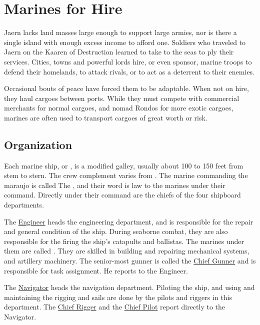 \chapter{Marines for Hire}
\label{ch:marines}
\setlength{\columnsep}{\defcolwidth}
\begin{multicols*}{2}
Jaern lacks land masses large enough to support large armies, nor is there a single island with enough excess income to afford one. Soldiers who traveled to Jaern on the Kaaren of Destruction learned to take to the seas to ply their services. Cities, towns and powerful lords hire, or even sponsor, marine troops to defend their homelands, to attack rivals, or to act as a deterrent to their enemies.

Occasional bouts of peace have forced them to be adaptable. When not on hire, they haul cargoes between ports. While they must compete with commercial merchants for normal cargoes, and nomad Rondos for more exotic cargoes, marines are often used to transport cargoes of great worth or risk.

\section{Organization}

Each marine ship, or , is a modified galley, usually about 100 to 150 feet from stem to stern. The crew complement varies from . The marine commanding the maraujo is called The , and their word is law to the marines under their command. Directly under their
command are the chiefs of the four shipboard departments.

The \ul{Engineer} heads the engineering department, and is responsible for the repair and general condition of the ship. During seaborne combat, they are also responsible for the firing the ship’s catapults and ballistas. The marines under them are called . They are skilled in building and repairing mechanical systems, and artillery machinery. The senior-most gunner is called the \ul{Chief Gunner} and is responsible for task assignment. He reports to the Engineer.

The \ul{Navigator} heads the navigation department. Piloting the ship, and using and maintaining the rigging and sails are done by the pilots and riggers in this department. The \ul{Chief Rigger} and the \ul{Chief Pilot} report directly to the Navigator.


\end{multicols*}
